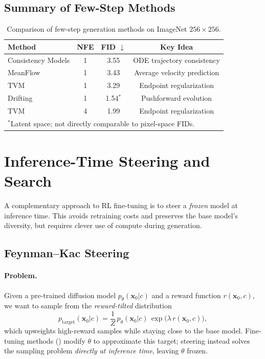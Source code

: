 \documentclass[11pt]{article}
\begin{document}
\subsection{Summary of Few-Step Methods}

\begin{table}[h]
\centering
\caption{Comparison of few-step generation methods on ImageNet $256 \times 256$.}
\label{tab:fewstep}
\begin{tabular}{lccc}
\toprule
\textbf{Method} & \textbf{NFE} & \textbf{FID $\downarrow$} & \textbf{Key Idea} \\
\midrule
Consistency Models & 1 & 3.55 & ODE trajectory consistency \\
MeanFlow & 1 & 3.43 & Average velocity prediction \\
TVM & 1 & 3.29 & Endpoint regularization \\
Drifting & 1 & 1.54$^*$ & Pushforward evolution \\
TVM & 4 & 1.99 & Endpoint regularization \\
\bottomrule
\multicolumn{4}{l}{\footnotesize $^*$Latent space; not directly comparable to pixel-space FIDs.}
\end{tabular}
\end{table}

\section{Inference-Time Steering and Search}
\label{sec:steering}

A complementary approach to RL fine-tuning is to steer a \emph{frozen} model at inference time.
This avoids retraining costs and preserves the base model's diversity, but requires clever use of compute during generation.

\subsection{Feynman--Kac Steering}
\label{sec:fk}

\paragraph{Problem.}
Given a pre-trained diffusion model $p_\theta(\mathbf{x}_0 | c)$ and a reward function $r(\mathbf{x}_0, c)$, we want to sample from the \emph{reward-tilted} distribution
\begin{equation}
    p_{\mathrm{target}}(\mathbf{x}_0 | c) = \frac{1}{Z}\, p_\theta(\mathbf{x}_0 | c)\, \exp\bigl(\lambda\, r(\mathbf{x}_0, c)\bigr),
    \label{eq:tilted}
\end{equation}
which upweights high-reward samples while staying close to the base model.
Fine-tuning methods () modify $\theta$ to approximate this target; steering instead solves the sampling problem \emph{directly at inference time}, leaving $\theta$ frozen.
\end{document}
